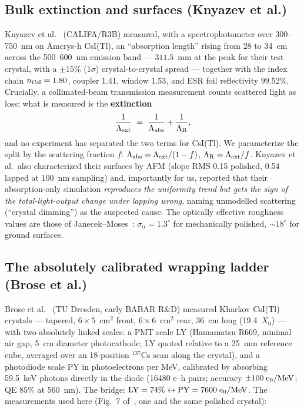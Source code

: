 \documentclass[11pt,a4paper]{article}
\newcommand{\csitl}{CsI(Tl)}
\newcommand{\lext}{\Lambda_{\rm ext}}
\newcommand{\labs}{\Lambda_{\rm abs}}
\newcommand{\lray}{\Lambda_{\rm R}}
\newcommand{\sa}{\sigma_\alpha}
\begin{document}
\subsection{Bulk extinction and surfaces (Knyazev et al.)}

Knyazev et al.~\cite{knyazev2021} (CALIFA/R3B) measured, with a spectrophotometer over
300--750~nm on Amcrys-h \csitl{}, an ``absorption length'' rising from 28 to 34~cm
across the 500--600~nm emission band --- $311.5$~mm at the peak for their test crystal,
with a $\pm15\%$ ($1\sigma$) crystal-to-crystal spread --- together with the index chain
$n_{\rm CsI} = 1.80$, coupler 1.41, window 1.53, and ESR foil reflectivity 99.52\%.
Crucially, a collimated-beam transmission measurement counts scattered light as loss:
what is measured is the \textbf{extinction}
\begin{equation}
  \frac{1}{\lext} \;=\; \frac{1}{\labs} + \frac{1}{\lray},
  \label{eq:split}
\end{equation}
and no experiment has separated the two terms for \csitl{}. We parameterize the split by
the scattering fraction $f$: $\labs = \lext/(1-f)$, $\lray = \lext/f$. Knyazev et al.\
also characterized their surfaces by AFM (slope RMS 0.15 polished, 0.54 lapped at 100~nm
sampling) and, importantly for us, reported that their absorption-only simulation
\emph{reproduces the uniformity trend but gets the sign of the total-light-output change
under lapping wrong}, naming unmodelled scattering (``crystal dimming'') as the suspected
cause. The optically effective roughness values are those of
Janecek--Moses~\cite{janecek2010}: $\sa = 1.3^\circ$ for mechanically polished,
$\sim$$18^\circ$ for ground surfaces.

\subsection{The absolutely calibrated wrapping ladder (Brose et al.)}
\label{sec:brose}

Brose et al.~\cite{brose1998} (TU Dresden, early BABAR R\&D) measured Kharkov \csitl{}
crystals --- tapered, $6\times5$~cm$^2$ front, $6\times6$~cm$^2$ rear, 36~cm long
(19.4~$X_0$) --- with two absolutely linked scales: a PMT scale LY (Hamamatsu R669,
minimal air gap, 5~cm diameter photocathode; LY quoted relative to a 25~mm reference
cube, averaged over an 18-position $^{137}$Cs scan along the crystal), and a photodiode
scale PY in photoelectrons per MeV, calibrated by absorbing 59.5~keV photons directly in
the diode (16480 e--h pairs; accuracy $\pm100\;{\rm e_0/MeV}$; QE $85\%$ at 560~nm). The
bridge: ${\rm LY} = 74\% \leftrightarrow {\rm PY} = 7600\;{\rm e_0/MeV}$. The
measurements used here (Fig.~7 of~\cite{brose1998}, one and the same polished crystal):
\end{document}
